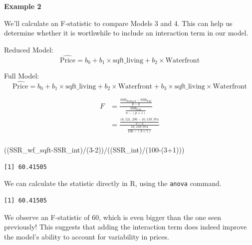 \documentclass[
  letterpaper,
  DIV=11,
  numbers=noendperiod]{scrreprt}
\newenvironment{Shaded}{\begin{snugshade}}{\end{snugshade}}
\newcommand{\DecValTok}[1]{\textcolor[rgb]{0.68,0.00,0.00}{#1}}
\newcommand{\FunctionTok}[1]{\textcolor[rgb]{0.28,0.35,0.67}{#1}}
\newcommand{\NormalTok}[1]{\textcolor[rgb]{0.00,0.23,0.31}{#1}}
\newcommand{\SpecialCharTok}[1]{\textcolor[rgb]{0.37,0.37,0.37}{#1}}
\begin{document}
\textbf{Example 2}

We'll calculate an F-statistic to compare Models 3 and 4. This can help
us determine whether it is worthwhile to include an interaction term in
our model.

Reduced Model:
\[\widehat{\text{Price}}= b_0+ b_1 \times\text{sqft\_living} + b_2\times\text{Waterfront}\]

Full Model:
\[\widehat{\text{Price}}= b_0+ b_1 \times\text{sqft\_living}+ b_2\times\text{Waterfront} + b_3\times\text{sqft\_living}\times\text{Waterfront}\]

\[
\begin{aligned}
F &= \frac{\frac{\text{SSR}_{\text{Reduced}}-\text{SSR}_{\text{Full}}}{p-q}}{\frac{\text{SSR}_{\text{Full}}}{n-(p+1)}} \\
&=\frac{\frac{16,521,296-10,139,974}{3-2}}{\frac{10,139,974}{100-(3+1)}} \\
\end{aligned}
\]

\begin{Shaded}
\begin{Highlighting}[]
\NormalTok{((SSR\_wf\_sqft}\SpecialCharTok{{-}}\NormalTok{SSR\_int)}\SpecialCharTok{/}\NormalTok{(}\DecValTok{3{-}2}\NormalTok{))}\SpecialCharTok{/}\NormalTok{((SSR\_int)}\SpecialCharTok{/}\NormalTok{(}\DecValTok{100}\SpecialCharTok{{-}}\NormalTok{(}\DecValTok{3}\SpecialCharTok{+}\DecValTok{1}\NormalTok{)))}
\end{Highlighting}
\end{Shaded}

\begin{verbatim}
[1] 60.41505
\end{verbatim}

We can calculate the statistic directly in R, using the \texttt{anova}
command.

\begin{Shaded}
\end{Shaded}

\begin{verbatim}
[1] 60.41505
\end{verbatim}

We observe an F-statistic of 60, which is even bigger than the one seen
previously! This suggests that adding the interaction term does indeed
improve the model's ability to account for variability in prices.
\end{document}
